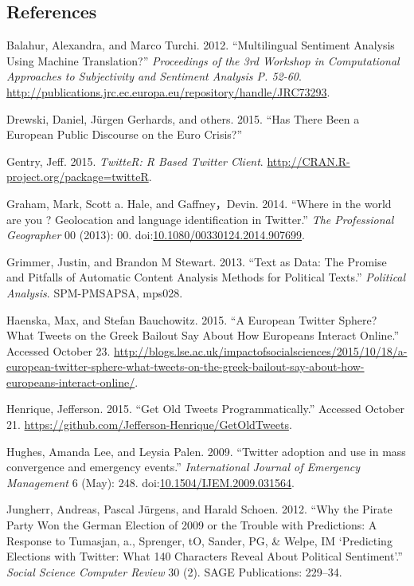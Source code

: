 \documentclass[]{article}
\begin{document}
\subsection{References}\label{references}

Balahur, Alexandra, and Marco Turchi. 2012. ``Multilingual Sentiment
Analysis Using Machine Translation?'' \emph{Proceedings of the 3rd
Workshop in Computational Approaches to Subjectivity and Sentiment
Analysis P. 52-60}.
\url{http://publications.jrc.ec.europa.eu/repository/handle/JRC73293}.

Drewski, Daniel, J{ü}rgen Gerhards, and others. 2015. ``Has There Been a
European Public Discourse on the Euro Crisis?''

Gentry, Jeff. 2015. \emph{TwitteR: R Based Twitter Client}.
\url{http://CRAN.R-project.org/package=twitteR}.

Graham, Mark, Scott a. Hale, and Gaffney，Devin. 2014. ``Where in the
world are you ? Geolocation and language identification in Twitter.''
\emph{The Professional Geographer} 00 (2013): 00.
doi:\href{http://dx.doi.org/10.1080/00330124.2014.907699}{10.1080/00330124.2014.907699}.

Grimmer, Justin, and Brandon M Stewart. 2013. ``Text as Data: The
Promise and Pitfalls of Automatic Content Analysis Methods for Political
Texts.'' \emph{Political Analysis}. SPM-PMSAPSA, mps028.

Haenska, Max, and Stefan Bauchowitz. 2015. ``A European Twitter Sphere?
What Tweets on the Greek Bailout Say About How Europeans Interact
Online.'' Accessed October 23.
\url{http://blogs.lse.ac.uk/impactofsocialsciences/2015/10/18/a-european-twitter-sphere-what-tweets-on-the-greek-bailout-say-about-how-europeans-interact-online/}.

Henrique, Jefferson. 2015. ``Get Old Tweets Programmatically.'' Accessed
October 21. \url{https://github.com/Jefferson-Henrique/GetOldTweets}.

Hughes, Amanda Lee, and Leysia Palen. 2009. ``Twitter adoption and use
in mass convergence and emergency events.'' \emph{International Journal
of Emergency Management} 6 (May): 248.
doi:\href{http://dx.doi.org/10.1504/IJEM.2009.031564}{10.1504/IJEM.2009.031564}.

Jungherr, Andreas, Pascal J{ü}rgens, and Harald Schoen. 2012. ``Why the
Pirate Party Won the German Election of 2009 or the Trouble with
Predictions: A Response to Tumasjan, a., Sprenger, tO, Sander, PG, \&
Welpe, IM `Predicting Elections with Twitter: What 140 Characters Reveal
About Political Sentiment'.'' \emph{Social Science Computer Review} 30
(2). SAGE Publications: 229--34.
\end{document}
